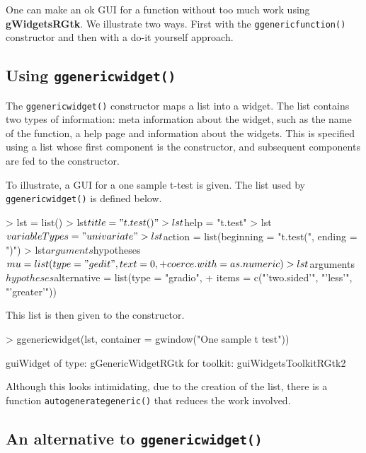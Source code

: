 \documentclass[12pt]{article}
\newcommand{\RFunc}[1]{\texttt{#1()}}
\newcommand{\RPackage}[1]{\textbf{#1}}
\begin{document}
One can make an ok GUI for a function without too much work using
\RPackage{gWidgetsRGtk}. We illustrate two ways. First with the
\RFunc{ggenericfunction} constructor and then with a do-it yourself
approach. 


\subsection{Using \RFunc{ggenericwidget}}
\label{sec:using-ggenericwidget}


The \RFunc{ggenericwidget} constructor maps a list into a widget. The
list contains two types of information: meta information about the
widget, such as the name of the function, a help page and information about the widgets. This is specified using a list whose first component is the constructor, and subsequent components are fed to the constructor.

To illustrate, a GUI for a one sample t-test  is given. The
list used by \RFunc{ggenericwidget}  is defined below.

\begin{Schunk}
\begin{Sinput}
> lst = list()
> lst$title = "t.test()"
> lst$help = "t.test"
> lst$variableTypes = "univariate"
> lst$action = list(beginning = "t.test(", ending = ")")
> lst$arguments$hypotheses$mu = list(type = "gedit", text = 0, 
+     coerce.with = as.numeric)
> lst$arguments$hypotheses$alternative = list(type = "gradio", 
+     items = c("'two.sided'", "'less'", "'greater'"))
\end{Sinput}
\end{Schunk}

This list is then given to the constructor.
\begin{Schunk}
\begin{Sinput}
> ggenericwidget(lst, container = gwindow("One sample t test"))
\end{Sinput}
\begin{Soutput}
guiWidget of type: gGenericWidgetRGtk for toolkit: guiWidgetsToolkitRGtk2 
\end{Soutput}
\end{Schunk}

Although this looks intimidating, due to the creation of the list,
there is a function \RFunc{autogenerategeneric} that reduces the work involved.


\subsection{An alternative to \RFunc{ggenericwidget}}
\label{sec:an-altern-ggenericwidget}
\end{document}
